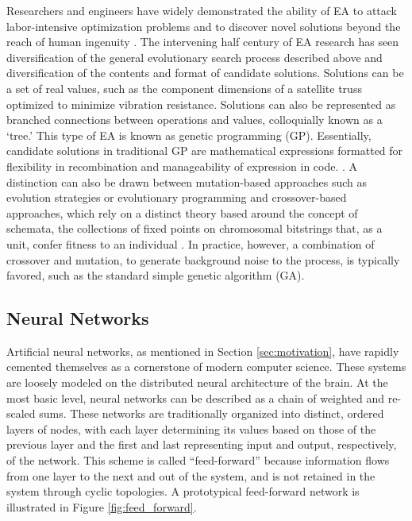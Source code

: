 \documentclass[a4paper]{article}
\begin{document}
Researchers and engineers have widely demonstrated the ability of EA to attack labor-intensive optimization problems and to discover novel solutions beyond the reach of human ingenuity \cite{Poli2008AProgramming}. The intervening half century of EA research has seen diversification of the general evolutionary search process described above and diversification of the contents and format of candidate solutions. Solutions can be a set of real values, such as the component dimensions of a satellite truss optimized to minimize vibration resistance. Solutions can also be represented as branched connections between operations and values, colloquially known as a ‘tree.’ This type of EA is known as genetic programming (GP). Essentially, candidate solutions in traditional GP are mathematical expressions formatted for flexibility in recombination and manageability of expression in code. \cite{Poli2008AProgramming}. A distinction can also be drawn between mutation-based approaches such as evolution strategies or evolutionary programming and crossover-based approaches, which rely on a distinct theory based around the concept of schemata, the collections of fixed points on chromosomal bitstrings that, as a unit, confer fitness to an individual \cite{2006RepresentationsAlgorithms}. In practice, however, a combination of crossover and mutation, to generate background noise to the process, is typically favored, such as the standard simple genetic algorithm (GA).

\subsection{Neural Networks}

Artificial neural networks, as mentioned in Section \ref{sec:motivation}, have rapidly cemented themselves as a cornerstone of modern computer science. These systems are loosely modeled on the distributed neural architecture of the brain. At the most basic level, neural networks can be described as a chain of weighted and re-scaled sums. These networks are traditionally organized into distinct, ordered layers of nodes, with each layer determining its values based on those of the previous layer and the first and last representing input and output, respectively, of the network. This scheme is called ``feed-forward'' because information flows from one layer to the next and out of the system, and is not retained in the system through cyclic topologies. A prototypical feed-forward network is illustrated in Figure \ref{fig:feed_forward}.
\end{document}
